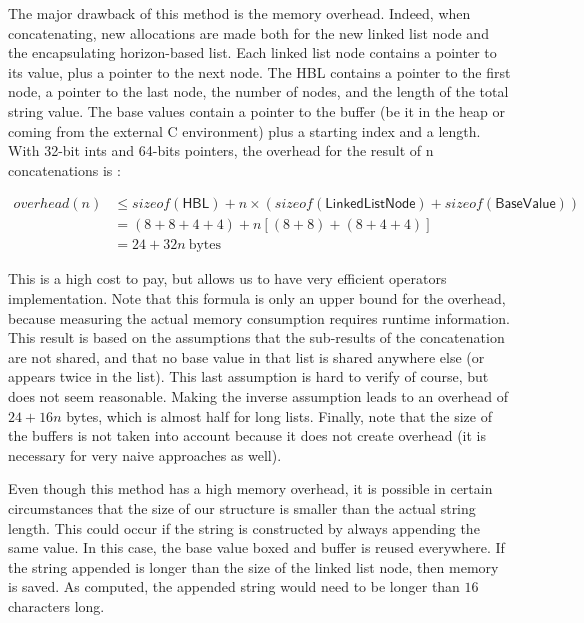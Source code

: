 \documentclass[twoside,11pt,a4paper]{article}
\newcommand{\java}[1]{\textsf{#1}}
\begin{document}
The major drawback of this method is the memory overhead. Indeed, when concatenating, new allocations are made both for the new linked list node and the encapsulating horizon-based list. Each linked list node contains a pointer to its value, plus a pointer to the next node. The HBL contains a pointer to the first node, a pointer to the last node, the number of nodes, and the length of the total string value. The base values contain a pointer to the buffer (be it in the heap or coming from the external C environment) plus a starting index and a length. With 32-bit ints and 64-bits pointers, the overhead for the result of n concatenations is :

\begin{align*}
overhead(n) &\leq sizeof(\java{HBL}) + n \times (sizeof(\java{LinkedListNode}) + sizeof(\java{BaseValue})) \\
			&= (8+8+4+4) + n\left[(8 + 8)+(8+4+4)\right]\\
			&= 24 + 32n \ \text{bytes}
\end{align*}

This is a high cost to pay, but allows us to have very efficient operators implementation. Note that this formula is only an upper bound for the overhead, because measuring the actual memory consumption requires runtime information. This result is based on the assumptions that the sub-results of the concatenation are not shared, and that no base value in that list is shared anywhere else (or appears twice in the list). This last assumption is hard to verify of course, but does not seem reasonable. Making the inverse assumption leads to an overhead of $24 + 16n$ bytes, which is almost half for long lists. Finally, note that the size of the buffers is not taken into account because it does not create overhead (it is necessary for very naive approaches as well).

Even though this method has a high memory overhead, it is possible in certain circumstances that the size of our structure is smaller than the actual string length. This could occur if the string is constructed by always appending the same value. In this case, the base value boxed and buffer is reused everywhere. If the string appended is longer than the size of the linked list node, then memory is saved. As computed, the appended string would need to be longer than $16$ characters long.
\end{document}
